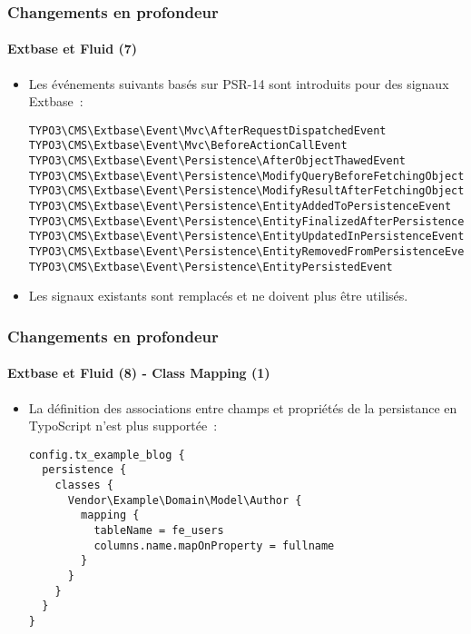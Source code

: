 
\begin{frame}[fragile]
	\frametitle{Changements en profondeur}
	\framesubtitle{Extbase et Fluid (7)}

	\lstset{basicstyle=\tiny\ttfamily}

	\begin{itemize}
		\item Les événements suivants basés sur PSR-14 sont introduits pour des signaux Extbase~:
\begin{lstlisting}
TYPO3\CMS\Extbase\Event\Mvc\AfterRequestDispatchedEvent
TYPO3\CMS\Extbase\Event\Mvc\BeforeActionCallEvent
TYPO3\CMS\Extbase\Event\Persistence\AfterObjectThawedEvent
TYPO3\CMS\Extbase\Event\Persistence\ModifyQueryBeforeFetchingObjectDataEvent
TYPO3\CMS\Extbase\Event\Persistence\ModifyResultAfterFetchingObjectDataEvent
TYPO3\CMS\Extbase\Event\Persistence\EntityAddedToPersistenceEvent
TYPO3\CMS\Extbase\Event\Persistence\EntityFinalizedAfterPersistenceEvent
TYPO3\CMS\Extbase\Event\Persistence\EntityUpdatedInPersistenceEvent
TYPO3\CMS\Extbase\Event\Persistence\EntityRemovedFromPersistenceEvent
TYPO3\CMS\Extbase\Event\Persistence\EntityPersistedEvent
\end{lstlisting}

		\item Les signaux existants sont remplacés et ne doivent plus être utilisés.

	\end{itemize}

\end{frame}


\begin{frame}[fragile]
	\frametitle{Changements en profondeur}
	\framesubtitle{Extbase et Fluid (8) - Class Mapping (1)}

	\lstset{basicstyle=\tiny\ttfamily}

	\begin{itemize}
		\item La définition des associations entre champs et propriétés de la persistance en TypoScript
			n'est plus supportée~:
\begin{lstlisting}
config.tx_example_blog {
  persistence {
    classes {
      Vendor\Example\Domain\Model\Author {
        mapping {
          tableName = fe_users
          columns.name.mapOnProperty = fullname
        }
      }
    }
  }
}
\end{lstlisting}

	\end{itemize}

\end{frame}


